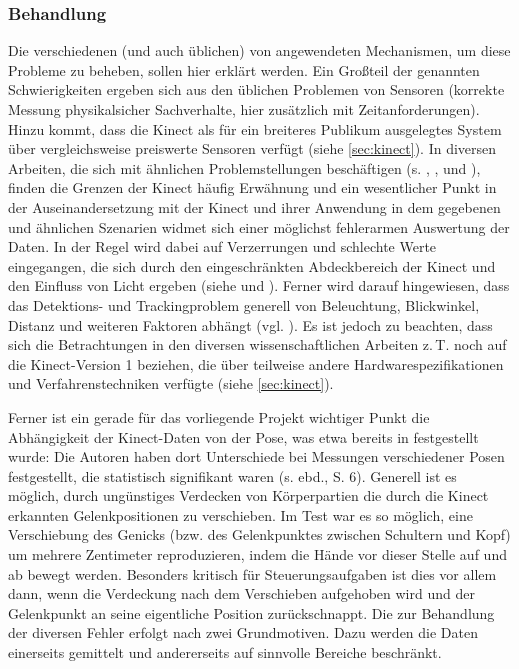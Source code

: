 	\subsubsection{Behandlung}
	Die verschiedenen (und auch üblichen) von angewendeten Mechanismen, um diese Probleme zu beheben, sollen hier erklärt werden. Ein Großteil der genannten Schwierigkeiten ergeben sich aus den üblichen Problemen von Sensoren (korrekte Messung physikalsicher Sachverhalte, hier zusätzlich mit Zeitanforderungen). Hinzu kommt, dass die Kinect als für ein breiteres Publikum ausgelegtes System über vergleichsweise preiswerte Sensoren verfügt (siehe \ref{sec:kinect}). In diversen Arbeiten, die sich mit ähnlichen Problemstellungen beschäftigen (s. \cite{biomid}, \cite{bodyprop}, \cite{kinectlight} und \cite{thermalsens}), finden die Grenzen der Kinect häufig Erwähnung und ein wesentlicher Punkt in der Auseinandersetzung mit der Kinect und ihrer Anwendung in dem gegebenen und ähnlichen Szenarien widmet sich einer möglichst fehlerarmen Auswertung der Daten. In der Regel wird dabei auf Verzerrungen und schlechte Werte eingegangen, die sich durch den eingeschränkten \glqq Abdeckbereich\grqq{} der Kinect und den Einfluss von Licht ergeben (siehe \cite{bodyprop} und \cite{kinectlight}). Ferner wird darauf hingewiesen, dass das Detektions- und Trackingproblem generell von Beleuchtung, Blickwinkel, Distanz und weiteren Faktoren abhängt (vgl. \cite{thermalsens}). Es ist jedoch zu beachten, dass sich die Betrachtungen in den diversen wissenschaftlichen Arbeiten z.\,T. noch auf die Kinect-Version 1 beziehen, die über teilweise andere Hardwarespezifikationen und Verfahrenstechniken verfügte (siehe \ref{sec:kinect}).\par
	Ferner ist ein gerade für das vorliegende Projekt wichtiger Punkt die Abhängigkeit der Kinect-Daten von der Pose, was etwa bereits in \cite{biomid} festgestellt wurde: Die Autoren haben dort Unterschiede bei Messungen verschiedener Posen festgestellt, die statistisch signifikant waren (s. ebd., S. 6). Generell ist es möglich, durch ungünstiges Verdecken von Körperpartien die durch die Kinect erkannten Gelenkpositionen zu verschieben. Im Test war es so möglich, eine Verschiebung des Genicks (bzw. des Gelenkpunktes zwischen Schultern und Kopf) um mehrere Zentimeter reproduzieren, indem die Hände vor dieser Stelle auf und ab bewegt werden. Besonders kritisch für Steuerungsaufgaben ist dies vor allem dann, wenn die Verdeckung nach dem Verschieben aufgehoben wird und der Gelenkpunkt an seine eigentliche Position \glqq zurückschnappt\grqq{}. Die zur Behandlung der diversen Fehler erfolgt nach zwei Grundmotiven. Dazu werden die Daten einerseits gemittelt und andererseits auf sinnvolle Bereiche beschränkt.
